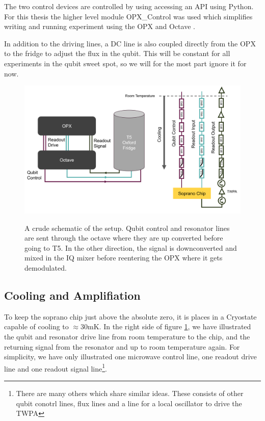 The two control devices are controlled by using accessing an API using Python. For this thesis the higher level module OPX\_Control was used which simplifies writing and running experiment using the OPX and Octave \cite{github}. 

In addition to the driving lines, a DC line is also coupled directly from the OPX to the fridge to adjust the flux in the qubit. This will be constant for all experiments in the qubit sweet spot, so we will for the most part ignore it for now. 


\begin{figure}[t]
    \caption{A crude schematic of the setup. Qubit control and resonator lines are sent through the octave where they are up converted before going to T5. In the other direction, the signal is downconverted and mixed in the IQ mixer before reentering the OPX where it gets demodulated.}
    \includegraphics[]{Figs/hardware/fridge_and_control.png}
    \label{fig:Fridge_control_hardware_setup}
\end{figure}


\subsection{Cooling and Amplifiation}
To keep the soprano chip just above the absolute zero, it is places in a Cryostate capable of cooling to $\approx 30 \text{mK}$. In the right side of  figure \ref{fig:Fridge_control_hardware_setup}, we have illustrated the qubit and resonator drive line from room temperature to the chip, and the returning signal from the resonator and up to room temperature again. For simplicity, we have only illustrated one microwave control line, one readout drive line and one readout signal line\footnote{There are many others which share similar ideas. These consists of other qubit conotrl lines, flux lines and a line for a local oscillator to drive the TWPA}.

